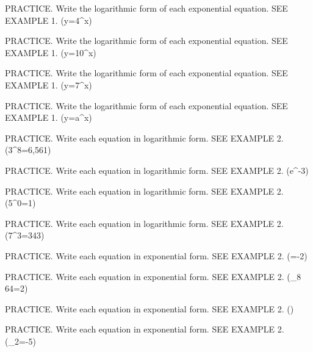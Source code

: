 \documentclass{article}
\newenvironment{practice}[2]{}{}        %
\newcommand{\answer}[1]{}               %
\newcommand{\te}[1]{}                   %
\begin{document}
\begin{practice}{20}{1}
PRACTICE. Write the logarithmic form of each exponential equation. SEE EXAMPLE 1.
(y=4^x)
\answer{(\log_4 y=x)}
\end{practice}
\begin{practice}{21}{1}
PRACTICE. Write the logarithmic form of each exponential equation. SEE EXAMPLE 1.
(y=10^x)
\answer{(\log y=x)}
\end{practice}
\begin{practice}{22}{1}
PRACTICE. Write the logarithmic form of each exponential equation. SEE EXAMPLE 1.
(y=7^x)
\answer{(\log_7 y=x)}
\end{practice}
\begin{practice}{23}{1}
PRACTICE. Write the logarithmic form of each exponential equation. SEE EXAMPLE 1.
(y=a^x)
\answer{(\log_a y=x)}
\end{practice}
\begin{practice}{24}{1}
PRACTICE. Write each equation in logarithmic form. SEE EXAMPLE 2.
(3^8=6,561)
\answer{(\log_3 6561=8)}
\end{practice}
\begin{practice}{25}{1}
PRACTICE. Write each equation in logarithmic form. SEE EXAMPLE 2.
(e^{-3})
\answer{(\ln0.0498\approx-3)}
\end{practice}
\begin{practice}{26}{1}
PRACTICE. Write each equation in logarithmic form. SEE EXAMPLE 2.
(5^0=1)
\answer{(\log_5 1=0)}
\end{practice}
\begin{practice}{27}{1}
PRACTICE. Write each equation in logarithmic form. SEE EXAMPLE 2.
(7^3=343)
\answer{(\log_7 343=3)}
\end{practice}
\begin{practice}{28}{1}
PRACTICE. Write each equation in exponential form. SEE EXAMPLE 2.
(\log{}=-2)
\answer{(10^{-2}=\frac1{100})}
\end{practice}
\begin{practice}{29}{1}
PRACTICE. Write each equation in exponential form. SEE EXAMPLE 2.
(\log_8 64=2)
\answer{(8^2=64)}
\end{practice}
\begin{practice}{30}{1}
PRACTICE. Write each equation in exponential form. SEE EXAMPLE 2.
()
\answer{(e^5=148.41)}
\te{Printed answer uses equality; likely approximate equality, as in the prompt.}
\end{practice}
\begin{practice}{31}{1}
PRACTICE. Write each equation in exponential form. SEE EXAMPLE 2.
(\log_2=-5)
\answer{(2^{-5}=\frac1{32})}
\end{practice}
\end{document}
